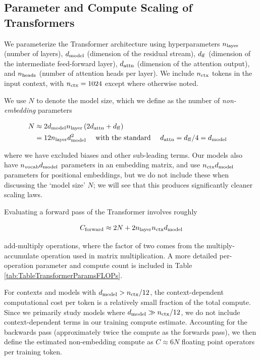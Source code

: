 \subsection{Parameter and Compute Scaling of Transformers}
\label{sec:ParameterComputeCounts}

 We parameterize the Transformer architecture using hyperparameters $n_{\rm layer}$ (number of layers), $d_{{\rm model}}$ (dimension of the residual stream), $d_{\rm ff}$ (dimension of the intermediate feed-forward layer), $d_{\rm attn}$ (dimension of the attention output), and $n_{\rm heads}$ (number of attention heads per layer).  We include $n_{\rm ctx}$ tokens in the input context, with $n_{\rm ctx} = 1024$ except where otherwise noted.

We use $N$ to denote the model size, which we define as the number of \emph{non-embedding} parameters

\begin{align}
\label{eq:ModelSizeDefinition}
N & \approx  2d_{{\rm model}}n_{{\rm layer}}\left(2d_{{\rm attn}}+d_{{\rm ff}}\right) & \nonumber \\
& = 12 n_{\rm layer} d_{{\rm model}}^2 \quad \text{ with the standard } \quad d_{\rm attn} = d_{\rm ff}/4 = d_{{\rm model}} &
\end{align}

where we have excluded biases and other sub-leading terms. Our models also have $n_{\rm vocab} d_{{\rm model}}$ parameters in an embedding matrix, and use $n_{\rm ctx} d_{{\rm model}}$ parameters for positional embeddings, but we do not include these when discussing the `model size' $N$; we will see that this produces significantly cleaner scaling laws.

Evaluating a forward pass of the Transformer involves roughly

\begin{equation}
\label{eq:ApproximateTotalCompute}
C_{\rm forward} \approx 2N + 2n_{{\rm layer}}n_{{\rm ctx}}d_{{\rm model}}
\end{equation}

add-multiply operations, where the factor of two comes from the multiply-accumulate operation used in matrix multiplication.  A more detailed per-operation parameter and compute count is included in Table \ref{tab:TableTransformerParamsFLOPs}.

For contexts and models with $d_{{\rm model}} > n_{\rm ctx} / 12$, the context-dependent computational cost per token is a relatively small fraction of the total compute. Since we primarily study models where $d_{\rm model} \gg n_{\rm ctx}/12$, we do not include context-dependent terms in our training compute estimate.  Accounting for the backwards pass (approximately twice the compute as the forwards pass), we then define the estimated non-embedding compute as $C \approx 6 N$ floating point operators per training token.


